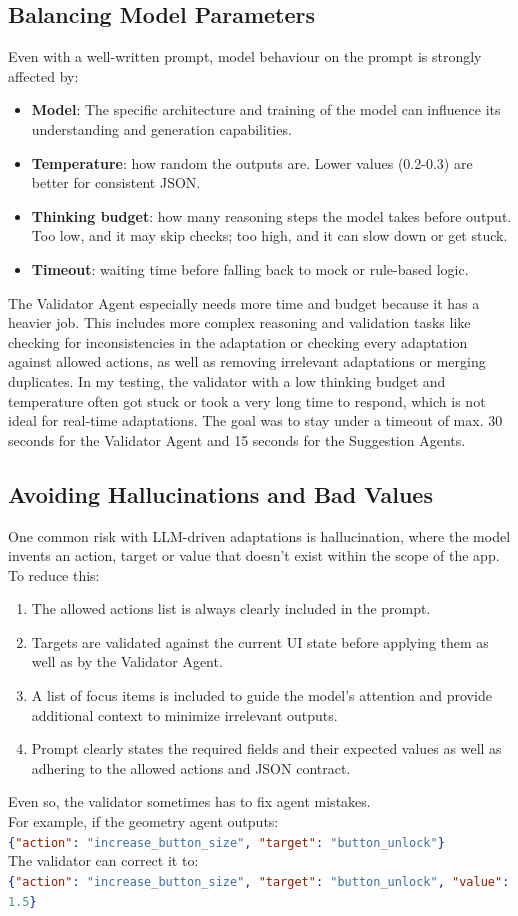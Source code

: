 \documentclass[openany]{book}
\begin{document}
\subsection{Balancing Model Parameters}
Even with a well-written prompt, model behaviour on the prompt is strongly affected by:
\begin{itemize}
    \item \textbf{Model}: The specific architecture and training of the model can influence its understanding and generation capabilities.
    \item \textbf{Temperature}: how random the outputs are. Lower values (0.2-0.3) are better for consistent JSON.
    \item \textbf{Thinking budget}: how many reasoning steps the model takes before output. Too low, and it may skip checks; too high, and it can slow down or get stuck.
    \item \textbf{Timeout}: waiting time before falling back to mock or rule-based logic.
\end{itemize}
The Validator Agent especially needs more time and budget because it has a heavier job. This includes more complex reasoning and validation tasks like checking for inconsistencies in the adaptation or checking every adaptation against allowed actions, as well as removing irrelevant adaptations or merging duplicates.
In my testing, the validator with a low thinking budget and temperature often got stuck or took a very long time to respond, which is not ideal for real-time adaptations. The goal was to stay under a timeout of max. 30 seconds for the Validator Agent and 15 seconds for the Suggestion Agents.

\subsection{Avoiding Hallucinations and Bad Values}
One common risk with LLM-driven adaptations is hallucination, where the model invents an action, target or value that doesn’t exist within the scope of the app.
To reduce this:
\begin{enumerate}
    \item The allowed actions list is always clearly included in the prompt.
    \item Targets are validated against the current UI state before applying them as well as by the Validator Agent.
    \item A list of focus items is included to guide the model's attention and provide additional context to minimize irrelevant outputs.
    \item Prompt clearly states the required fields and their expected values as well as adhering to the allowed actions and JSON contract.
\end{enumerate}
Even so, the validator sometimes has to fix agent mistakes.\\
For example, if the geometry agent outputs: \\
\lstinline[language=json]|{"action": "increase_button_size", "target": "button_unlock"}|\\
The validator can correct it to:\\
\lstinline[language=json]|{"action": "increase_button_size", "target": "button_unlock", "value": 1.5}|
\end{document}

